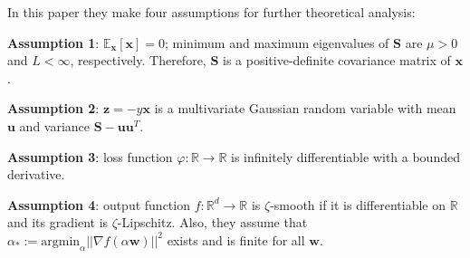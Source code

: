 \documentclass{article}
\begin{document}
\textbf{}

In this paper they make four assumptions for further theoretical analysis:

\textbf{Assumption 1}: $\mathbb{E}_{\textbf{x}}[\textbf{x}]=0$; minimum and maximum eigenvalues of $\textbf{S}$ are $\mu>0$ and $L<\infty$, respectively. Therefore, $\textbf{S}$ is a positive-definite covariance matrix of $\textbf{x}$.

\textbf{Assumption 2}: $\textbf{z}=-y\textbf{x}$ is a multivariate Gaussian random variable with mean $\textbf{u}$ and variance $\textbf{S}-\textbf{uu}^T$.

\textbf{Assumption 3}: loss function $\varphi:\mathbb{R}\rightarrow{}\mathbb{R}$ is infinitely differentiable with a bounded derivative.

\textbf{Assumption 4}: output function $f:\mathbb{R}^d\rightarrow{}\mathbb{R}$ is $\zeta$-smooth if it is differentiable on $\mathbb{R}$ and its gradient is $\zeta$-Lipschitz. Also, they assume that $\alpha_*:=\mathrm{argmin}_{\alpha}||\nabla f(\alpha\textbf{w})||^2$ exists and is finite for all $\textbf{w}$.
\end{document}
